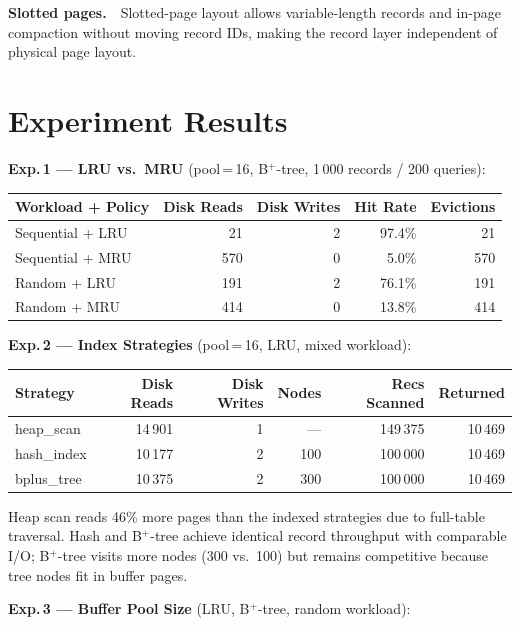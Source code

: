 \documentclass[11pt]{article}
\begin{document}
\textbf{Slotted pages.}\ \ Slotted-page layout allows variable-length records
and in-page compaction without moving record IDs, making the record layer
independent of physical page layout.

\section{Experiment Results}

\textbf{Exp.\,1 — LRU vs.\ MRU} (pool\,=\,16, B$^+$-tree, 1\,000 records / 200 queries):

\vspace{2pt}
{\small
\begin{tabular}{@{}lrrrr@{}}
\toprule
Workload + Policy & Disk Reads & Disk Writes & Hit Rate & Evictions \\
\midrule
Sequential + LRU  & 21  & 2 & 97.4\% & 21  \\
Sequential + MRU  & 570 & 0 &  5.0\% & 570 \\
Random + LRU      & 191 & 2 & 76.1\% & 191 \\
Random + MRU      & 414 & 0 & 13.8\% & 414 \\
\bottomrule
\end{tabular}}

\vspace{4pt}
\textbf{Exp.\,2 — Index Strategies} (pool\,=\,16, LRU, mixed workload):

\vspace{2pt}
{\small
\begin{tabular}{@{}lrrrrr@{}}
\toprule
Strategy   & Disk Reads & Disk Writes & Nodes & Recs Scanned & Returned \\
\midrule
heap\_scan  & 14\,901 & 1 & —   & 149\,375 & 10\,469 \\
hash\_index & 10\,177 & 2 & 100 & 100\,000 & 10\,469 \\
bplus\_tree & 10\,375 & 2 & 300 & 100\,000 & 10\,469 \\
\bottomrule
\end{tabular}}

Heap scan reads 46\% more pages than the indexed strategies due to full-table
traversal. Hash and B$^+$-tree achieve identical record throughput with
comparable I/O; B$^+$-tree visits more nodes (300 vs.\ 100) but remains
competitive because tree nodes fit in buffer pages.

\vspace{4pt}
\textbf{Exp.\,3 — Buffer Pool Size} (LRU, B$^+$-tree, random workload):
\end{document}
